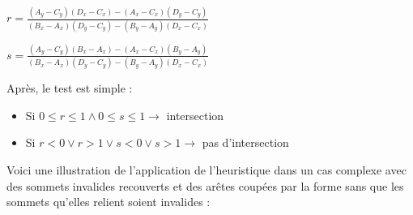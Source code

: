 \documentclass[a4paper,12pt]{report}
\begin{document}
\vspace*{3mm}
$r = \frac{(A_{y}-C_{y})(D_{x}-C_{x})-(A_{x}-C_{x})(D_{y}-C_{y})}{(B_{x}-A_{x})(D_{y}-C_{y})-(B_{y}-A_{y})(D_{x}-C_{x})}$
\vspace*{3mm}

$s = \frac{(A_{y}-C_{y})(B_{x}-A_{x})-(A_{x}-C_{x})(B_{y}-A_{y})}{(B_{x}-A_{x})(D_{y}-C_{y})-(B_{y}-A_{y})(D_{x}-C_{x})}$
\vspace*{3mm}

Après, le test est simple : 
\begin{itemize}
 \item Si $0\le r \le 1 \wedge 0 \le s \le 1 \rightarrow$ intersection
 \item Si $r<0 \vee r>1 \vee s<0 \vee s>1 \rightarrow$ pas d'intersection
\end{itemize}



Voici une illustration de l'application de l'heuristique dans un cas complexe avec des sommets invalides recouverts et des arêtes coupées par la forme sans que les sommets qu'elles relient soient invalides : 
\end{document}
